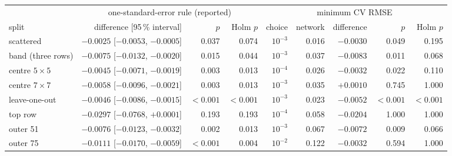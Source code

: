 \begin{tabular}{lrrrrrrrr}
\toprule
 & \multicolumn{3}{c}{one-standard-error rule (reported)} & \multicolumn{5}{c}{minimum CV RMSE} \\
\cmidrule(lr){2-4}\cmidrule(lr){5-9}
split & difference [95\,\% interval] & $p$ & Holm $p$ & choice & network & difference & $p$ & Holm $p$ \\
\midrule
scattered & $-0.0025$ [$-0.0053$, $-0.0005$] & 0.037 & 0.074 & $10^{-3}$ & 0.016 & $-0.0030$ & 0.049 & 0.195 \\
band (three rows) & $-0.0075$ [$-0.0132$, $-0.0020$] & 0.015 & 0.044 & $10^{-3}$ & 0.037 & $-0.0083$ & 0.011 & 0.068 \\
centre $5\times5$ & $-0.0045$ [$-0.0071$, $-0.0019$] & 0.003 & 0.013 & $10^{-4}$ & 0.026 & $-0.0032$ & 0.022 & 0.110 \\
centre $7\times7$ & $-0.0058$ [$-0.0096$, $-0.0021$] & 0.003 & 0.013 & $10^{-3}$ & 0.035 & $+0.0010$ & 0.745 & 1.000 \\
leave-one-out & $-0.0046$ [$-0.0086$, $-0.0015$] & $<0.001$ & $<0.001$ & $10^{-3}$ & 0.023 & $-0.0052$ & $<0.001$ & $<0.001$ \\
\midrule
top row & $-0.0297$ [$-0.0768$, $+0.0001$] & 0.193 & 0.193 & $10^{-4}$ & 0.058 & $-0.0204$ & 1.000 & 1.000 \\
outer 51 & $-0.0076$ [$-0.0123$, $-0.0032$] & 0.002 & 0.013 & $10^{-3}$ & 0.067 & $-0.0072$ & 0.009 & 0.066 \\
outer 75 & $-0.0111$ [$-0.0170$, $-0.0059$] & $<0.001$ & 0.004 & $10^{-2}$ & 0.122 & $-0.0032$ & 0.594 & 1.000 \\
\bottomrule
\end{tabular}
